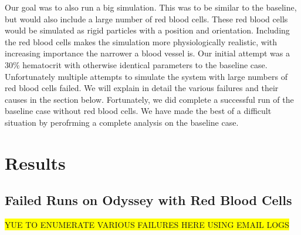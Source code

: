 \documentclass[11pt]{article} %
\begin{document}
Our goal was to also run a big simulation.  
This was to be similar to the baseline, but would also include a large number of red blood cells.
These red blood cells would be simulated as rigid particles with a position and orientation.
Including the red blood cells makes the simulation more physiologically realistic,
with increasing importance the narrower a blood vessel is.
Our initial attempt was a 30\% hematocrit with otherwise identical parameters to the baseline case.  
Unfortunately multiple attempts to simulate the system with large numbers of red blood cells failed.
We will explain in detail the various failures and their causes in the section below.
Fortunately, we did complete a successful run of the baseline case without red blood cells.
We have made the best of a difficult situation by perofrming a complete analysis on the baseline case.

\newpage
\section{Results}

\subsection{Failed Runs on Odyssey with Red Blood Cells}
\colorbox{yellow}{YUE TO ENUMERATE VARIOUS FAILURES HERE USING EMAIL LOGS}
\end{document}
